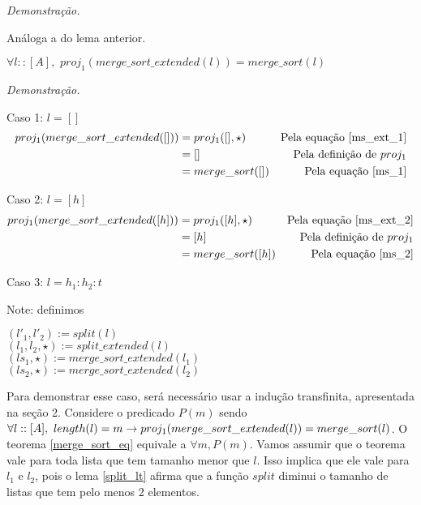 \documentclass[12pt, oneside, a4paper,english,brazil]{abntex2}
\begin{document}
\noindent \textit{Demonstra\c{c}\~ao.}

An\'aloga a do lema anterior.

\begin{teorema} \label{merge_sort_eq}
  $\forall l :: [A], \,\, proj_{1}(merge\_sort\_extended(l)) = merge\_sort(l)$
\end{teorema}

\noindent \textit{Demonstra\c{c}\~ao.}


Caso 1:  $l = []$
\begin{align*}
  proj_{1}(merge\_sort\_extended([])) &= proj_{1}([], \star) &\text{Pela equa\c{c}\~ao \ref{ms_ext_1}}\\
                                      &= [] &\text{Pela defini\c{c}\~ao de $proj_{1}$}\\
  &= merge\_sort([]) &\text{Pela equa\c{c}\~ao \ref{ms_1}}
\end{align*}

Caso 2:  $l = [h]$
\begin{align*}
  proj_{1}(merge\_sort\_extended([h])) &= proj_{1}([h], \star) &\text{Pela equa\c{c}\~ao \ref{ms_ext_2}}\\
                                      &= [h] &\text{Pela defini\c{c}\~ao de $proj_{1}$}\\
  &= merge\_sort([h]) &\text{Pela equa\c{c}\~ao \ref{ms_2}}
\end{align*}

Caso 3: $l = h_{1} : h_{2} : t$

Note: definimos
\begin{center}
$(l'_{1}, l'_{2}) := split(l)$\\
$(l_{1}, l_{2}, \star) := split\_extended(l)$\\
$(ls_{1}, \star) := merge\_sort\_extended(l_{1})$\\
$(ls_{2}, \star) := merge\_sort\_extended(l_{2})$
\end{center}

Para demonstrar esse caso, ser\'a necess\'ario usar a indu\c{c}\~ao transfinita, apresentada na se\c{c}\~ao 2.
Considere o predicado $P(m)$ sendo $\forall l :: [A], \,\, length(l) = m \rightarrow \\ proj_{1}(merge\_sort\_extended(l)) =
merge\_sort(l)$. O teorema \ref{merge_sort_eq} equivale  a $\forall m, P(m)$. Vamos assumir que o teorema vale para toda
lista que tem tamanho menor que $l$. Isso implica que ele vale para $l_{1}$ e $l_{2}$, pois o lema \ref{split_lt} afirma
que a fun\c{c}\~ao $split$ diminui o tamanho de listas que tem pelo menos 2 elementos.\\
\end{document}

